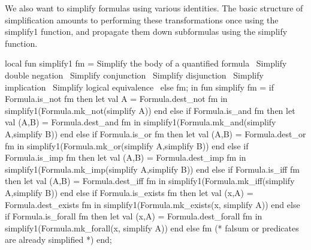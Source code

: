 \begin{node}
We also want to simplify formulas using various identities. The basic
structure of simplification amounts to performing these
transformations once using the {\Tt{}simplify1\nwendquote} function, and propagate
them down subformulas using the {\Tt{}simplify\nwendquote} function.
\end{node}

\nwenddocs{}\endmoddef\nwstartdeflinemarkup{}\nwenddeflinemarkup
local
  fun simplify1 fm =
    \LA{}Simplify the body of a quantified formula~{\nwtagstyle{}}\RA{}
    \LA{}Simplify double negation~{\nwtagstyle{}}\RA{}
    \LA{}Simplify conjunction~{\nwtagstyle{}}\RA{}
    \LA{}Simplify disjunction~{\nwtagstyle{}}\RA{}
    \LA{}Simplify implication~{\nwtagstyle{}}\RA{}
    \LA{}Simplify logical equivalence~{\nwtagstyle{}}\RA{}
    else fm;
in
fun simplify fm =
  if Formula.is_not fm
  then let val A = Formula.dest_not fm
       in simplify1(Formula.mk_not(simplify A)) end
  else if Formula.is_and fm
  then let val (A,B) = Formula.dest_and fm
       in simplify1(Formula.mk_and(simplify A,simplify B)) end
  else if Formula.is_or fm
  then let val (A,B) = Formula.dest_or fm
       in simplify1(Formula.mk_or(simplify A,simplify B)) end
  else if Formula.is_imp fm
  then let val (A,B) = Formula.dest_imp fm
       in simplify1(Formula.mk_imp(simplify A,simplify B)) end
  else if Formula.is_iff fm
  then let val (A,B) = Formula.dest_iff fm
       in simplify1(Formula.mk_iff(simplify A,simplify B)) end
  else if Formula.is_exists fm
  then let val (x,A) = Formula.dest_exists fm
       in simplify1(Formula.mk_exists(x, simplify A)) end
  else if Formula.is_forall fm
  then let val (x,A) = Formula.dest_forall fm
       in simplify1(Formula.mk_forall(x, simplify A)) end
  else fm (* falsum or predicates are already simplified *)
end;
